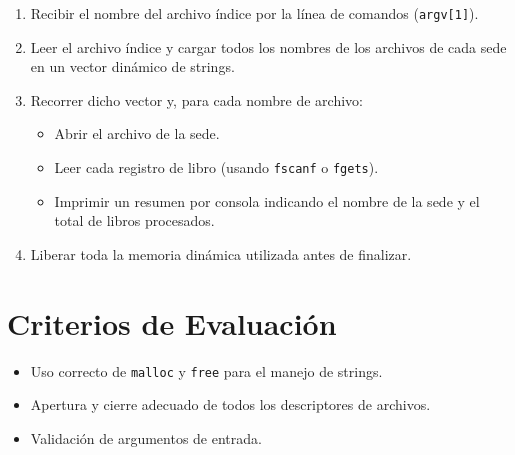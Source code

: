 \documentclass[12pt,a4paper]{article}
\begin{document}
\begin{enumerate}
    \item Recibir el nombre del archivo índice por la línea de comandos (\texttt{argv[1]}).
    \item Leer el archivo índice y cargar todos los nombres de los archivos de cada sede en un vector dinámico de strings.
    \item Recorrer dicho vector y, para cada nombre de archivo:
    \begin{itemize}
        \item Abrir el archivo de la sede.
        \item Leer cada registro de libro (usando \texttt{fscanf} o \texttt{fgets}).
        \item Imprimir un resumen por consola indicando el nombre de la sede y el total de libros procesados.
    \end{itemize}
    \item Liberar toda la memoria dinámica utilizada antes de finalizar.
\end{enumerate}

\section*{Criterios de Evaluación}
\begin{itemize}
    \item Uso correcto de \texttt{malloc} y \texttt{free} para el manejo de strings.
    \item Apertura y cierre adecuado de todos los descriptores de archivos.
    \item Validación de argumentos de entrada.
\end{itemize}
\end{document}
